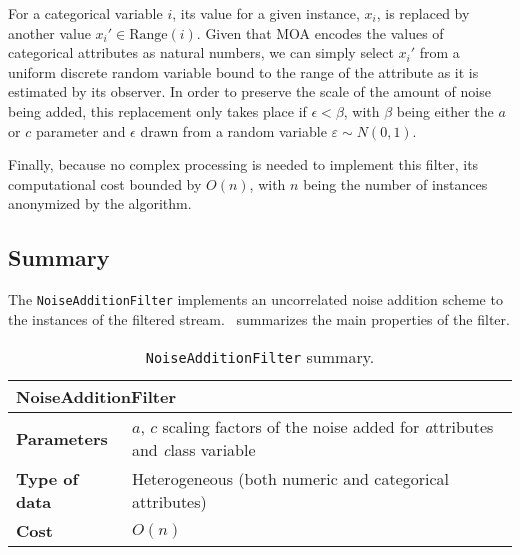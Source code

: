 For a categorical variable $i$, its value for a given instance, $x_i$, is replaced by another value $x_i' \in \mathrm{Range}(i)$. Given that MOA encodes the values of categorical attributes as natural numbers, we can simply select $x_i'$ from a uniform discrete random variable bound to the range of the attribute as it is estimated by its observer. In order to preserve the scale of the amount of noise being added, this replacement only takes place if $\epsilon < \beta$, with $\beta$ being either the $a$ or $c$ parameter and $\epsilon$ drawn from a random variable $\varepsilon \sim N(0,1)$.

Finally, because no complex processing is needed to implement this filter, its computational cost bounded by $O(n)$, with $n$ being the number of instances anonymized by the algorithm.

\subsection{Summary}
\label{Implementation:NoiseAddition:Summary}

The \texttt{NoiseAdditionFilter} implements an uncorrelated noise addition scheme to the instances of the filtered stream.~ summarizes the main properties of the filter.

\begin{table}[h]
	\centering
	\begin{tabular}{@{}ll@{}}
	\toprule
	\multicolumn{2}{l}{\textbf{NoiseAdditionFilter}}                                \\ \midrule
	\textbf{Parameters}   & $a$, $c$ scaling factors of the noise added for \textit{a}ttributes and \textit{c}lass variable  \\
	\textbf{Type of data} & Heterogeneous (both numeric and categorical attributes) \\
	\textbf{Cost}         & $O(n)$                                                  \\ \bottomrule
	\end{tabular}
	\caption{\texttt{NoiseAdditionFilter} summary.}
	\label{table:noiseaddition-summary}
\end{table}
